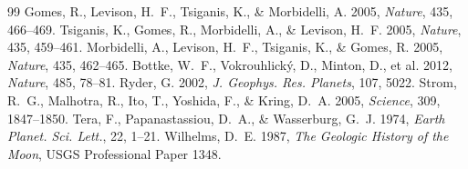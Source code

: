 \documentclass[11pt,a4paper]{article}
\begin{document}
\begin{thebibliography}{99}
 Gomes, R., Levison, H.~F., Tsiganis, K., \& Morbidelli, A. 2005, \textit{Nature}, 435, 466--469.
 Tsiganis, K., Gomes, R., Morbidelli, A., \& Levison, H.~F. 2005, \textit{Nature}, 435, 459--461.
 Morbidelli, A., Levison, H.~F., Tsiganis, K., \& Gomes, R. 2005, \textit{Nature}, 435, 462--465.
 Bottke, W.~F., Vokrouhlický, D., Minton, D., et al. 2012, \textit{Nature}, 485, 78--81.
 Ryder, G. 2002, \textit{J. Geophys. Res. Planets}, 107, 5022.
 Strom, R.~G., Malhotra, R., Ito, T., Yoshida, F., \& Kring, D.~A. 2005, \textit{Science}, 309, 1847--1850.
 Tera, F., Papanastassiou, D.~A., \& Wasserburg, G.~J. 1974, \textit{Earth Planet. Sci. Lett.}, 22, 1--21.
 Wilhelms, D.~E. 1987, \textit{The Geologic History of the Moon}, USGS Professional Paper 1348.
\end{thebibliography}
\end{document}
